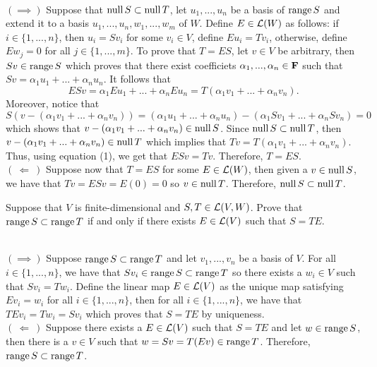 \begin{solution}
    \\ $(\implies)$ Suppose that $\operatorname{\text{null}} S \subset \operatorname{\text{null}} T$, let $u_1, ..., u_n$ be a basis of $\operatorname{\text{range}} S$ and extend it to a basis $u_1, ..., u_n, w_1, ..., w_m$ of $W$. Define $E \in \mathcal{L}(W)$ as follows: if $i \in \{1, ..., n\}$, then $u_i = Sv_i$ for some $v_i \in V$, define $Eu_i = Tv_i$, otherwise, define $Ew_j = 0$ for all $j \in \{1, ..., m\}$. To prove that $T = ES$, let $v \in V$ be arbitrary, then $Sv \in \operatorname{\text{range}} S$ which proves that there exist coefficiets $\alpha_1, ..., \alpha_n \in \mathbf{F}$ such that $Sv = \alpha_1 u_1 + ... + \alpha_n u_n$. It follows that
    \[ESv = \alpha_1 Eu_1 + ... + \alpha_n Eu_n = T(\alpha_1 v_1 + ... + \alpha_n v_n). \tag*{(1)}\]
    Moreover, notice that
    $$S(v - (\alpha_1 v_1 + ... + \alpha_n v_n)) = (\alpha_1 u_1 + ... + \alpha_n u_n) - (\alpha_1 Sv_1 + ... + \alpha_n Sv_n) = 0$$
    which shows that $v - (\alpha_1 v_1 + ... + \alpha_n v_n) \in \operatorname{\text{null}} S$. Since $\operatorname{\text{null}} S \subset \operatorname{\text{null}} T$, then $v - (\alpha_1 v_1 + ... + \alpha_n v_n) \in \operatorname{\text{null}} T$ which implies that $Tv = T(\alpha_1 v_1 + ... + \alpha_n v_n)$. Thus, using equation (1), we get that $ESv = Tv$. Therefore, $T = ES$. \\
    $( \ \Longleftarrow \ )$ Suppose now that $T = ES$ for some $E \in \mathcal{L}(W)$, then given a $v \in \operatorname{\text{null}} S$, we have that $Tv = ESv = E(0) = 0$ so $v \in \operatorname{\text{null}} T$. Therefore, $\operatorname{\text{null}} S \subset \operatorname{\text{null}} T$.\\
\end{solution}

\begin{exercise}
    Suppose that $V$ is finite-dimensional and $S,T \in \mathcal{L}(V,W)$. Prove that $\operatorname{\text{range}} S \subset \operatorname{\text{range}} T$ if and only if there exists $E \in \mathcal{L}(V)$ such that $S = TE$. \\
\end{exercise}

\begin{solution}
    \\ $( \implies )$ Suppose $\operatorname{\text{range}} S \subset \operatorname{\text{range}} T$ and let $v_1, ..., v_n$ be a basis of $V$. For all $i \in \{1, ..., n\}$, we have that $Sv_i \in \operatorname{\text{range}} S \subset \operatorname{\text{range}} T$ so there exists a $w_i \in V$ such that $Sv_i = Tw_i$. Define the linear map $E \in \mathcal{L}(V)$ as the unique map satisfying $Ev_i = w_i$ for all $i \in \{1, ..., n\}$, then for all $i \in \{1, ..., n\}$, we have that $TEv_i = Tw_i = Sv_i$ which proves that $S = TE$ by uniqueness. \\
    $( \ \Longleftarrow \ )$ Suppose there exists a $E \in \mathcal{L}(V)$ such that $S = TE$ and let $w \in \operatorname{\text{range}} S$, then there is a $v \in V$ such that $w = Sv = T(Ev) \in \operatorname{\text{range}} T$. Therefore, $\operatorname{\text{range}} S \subset \operatorname{\text{range}} T$. \\
\end{solution}

